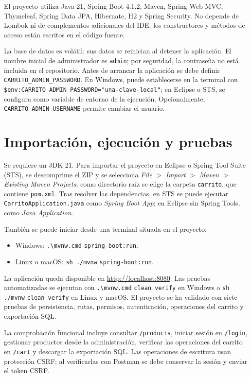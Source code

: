 \documentclass[9pt,a4paper]{extarticle}
\begin{document}
El proyecto utiliza Java 21, Spring Boot 4.1.2, Maven, Spring Web MVC,
Thymeleaf, Spring Data JPA, Hibernate, H2 y Spring Security. No depende de
Lombok ni de complementos adicionales del IDE: los constructores y métodos de
acceso están escritos en el código fuente.

La base de datos es volátil: sus datos se reinician al detener la aplicación.
El nombre inicial de administrador es \texttt{admin}; por seguridad, la
contraseña no está incluida en el repositorio. Antes de arrancar la aplicación
se debe definir \texttt{CARRITO\_ADMIN\_\allowbreak PASSWORD}. En Windows,
puede establecerse en la terminal con
\texttt{\$env:CARRITO\_ADMIN\_\allowbreak PASSWORD="una-clave-local"}; en Eclipse
o STS, se configura como variable de entorno de la ejecución. Opcionalmente,
\texttt{CARRITO\_ADMIN\_\allowbreak USERNAME} permite cambiar el usuario.

\section{Importación, ejecución y pruebas}

Se requiere un JDK 21. Para importar el proyecto en Eclipse o Spring Tool Suite
(STS), se descomprime el ZIP y se selecciona
\textit{File} $>$ \textit{Import} $>$ \textit{Maven} $>$ \textit{Existing Maven
Projects}; como directorio raíz se elige la carpeta \texttt{carrito},
que contiene \texttt{pom.xml}. Tras resolver las dependencias, en STS se puede
ejecutar \texttt{CarritoApplication.java} como \textit{Spring Boot App}; en
Eclipse sin Spring Tools, como \textit{Java Application}.

También se puede iniciar desde una terminal situada en el proyecto:
\begin{itemize}
    \item Windows: \texttt{.\textbackslash mvnw.cmd}
    \texttt{spring-boot:run}.
    \item Linux o macOS: \texttt{sh ./mvnw}
    \texttt{spring-boot:run}.
\end{itemize}
La aplicación queda disponible en
\url{http://localhost:8080}. Las pruebas automatizadas se ejecutan con
\texttt{.\textbackslash mvnw.cmd} \texttt{clean verify} en Windows o
\texttt{sh ./mvnw} \texttt{clean verify} en Linux y macOS. El proyecto se ha
validado con siete pruebas de persistencia, rutas, permisos, autenticación,
operaciones del carrito y exportación SQL.

La comprobación funcional incluye consultar \texttt{/products}, iniciar
sesión en \texttt{/login}, gestionar productos desde la administración,
verificar las operaciones del carrito en \texttt{/cart} y descargar la
exportación SQL. Las operaciones de escritura usan protección CSRF; al
verificarlas con Postman se debe conservar la sesión y enviar el token CSRF.
\end{document}
